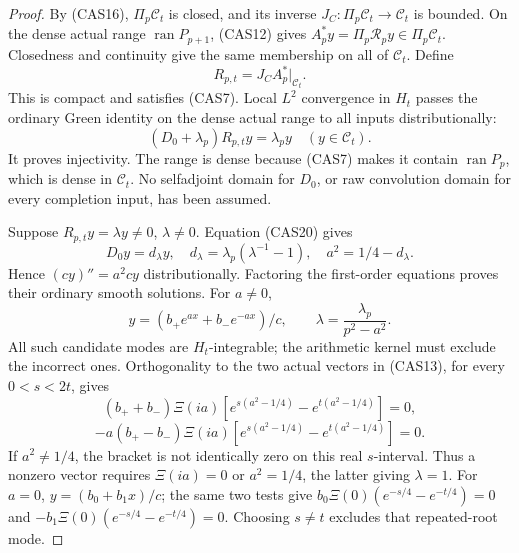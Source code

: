 \documentclass[11pt]{article}
\theoremstyle{remark}\newtheorem{remark}[theorem]{Remark}
\begin{document}
\begin{proof}
By (CAS16), \(\Pi_p\mathcal C_t\) is closed, and its inverse
\(J_C:\Pi_p\mathcal C_t\to\mathcal C_t\) is bounded. On the dense
actual range \(\operatorname{ran}P_{p+1}\), (CAS12) gives
\(A_p^*y=\Pi_p\mathcal R_py\in\Pi_p\mathcal C_t\).
Closedness and continuity give the same membership on all of
\(\mathcal C_t\). Define
\[
 R_{p,t}=J_CA_p^*|_{\mathcal C_t}.                       \tag{CAS19}
\]
This is compact and satisfies (CAS7). Local \(L^2\) convergence in
\(H_t\) passes the ordinary Green identity on the dense actual
range to all inputs distributionally:
\[
 (D_0+\lambda_p)R_{p,t}y=\lambda_py
                                  \quad(y\in\mathcal C_t). \tag{CAS20}
\]
It proves injectivity. The range is dense because (CAS7) makes it
contain \(\operatorname{ran}P_p\), which is dense in \(\mathcal C_t\).
No selfadjoint domain for \(D_0\), or raw convolution domain for
every completion input, has been assumed.

Suppose \(R_{p,t}y=\lambda y\ne0\), \(\lambda\ne0\).
Equation (CAS20) gives
\[
 D_0y=d_\lambda y,
 \quad d_\lambda=\lambda_p(\lambda^{-1}-1),
 \quad a^2=1/4-d_\lambda.
\]
Hence \((cy)''=a^2cy\) distributionally. Factoring the first-order
equations proves their ordinary smooth solutions. For \(a\ne0\),
\[
 y=(b_+e^{ax}+b_-e^{-ax})/c,\qquad
                       \lambda=\frac{\lambda_p}{p^2-a^2}. \tag{CAS21}
\]
All such candidate modes are \(H_t\)-integrable; the arithmetic
kernel must exclude the incorrect ones. Orthogonality to the two
actual vectors in (CAS13), for every \(0<s<2t\), gives
\[
 (b_++b_-)\Xi(ia)
      [e^{s(a^2-1/4)}-e^{t(a^2-1/4)}]=0,
\]
\[
 -a(b_+-b_-)\Xi(ia)
      [e^{s(a^2-1/4)}-e^{t(a^2-1/4)}]=0.                \tag{CAS22}
\]
If \(a^2\ne1/4\), the bracket is not identically zero on this
real \(s\)-interval. Thus a nonzero vector requires \(\Xi(ia)=0\)
or \(a^2=1/4\), the latter giving \(\lambda=1\).
For \(a=0\), \(y=(b_0+b_1x)/c\); the same two tests give
\(b_0\Xi(0)(e^{-s/4}-e^{-t/4})=0\) and
\(-b_1\Xi(0)(e^{-s/4}-e^{-t/4})=0\). Choosing \(s\ne t\) excludes
that repeated-root mode.


\end{proof}
\end{document}
